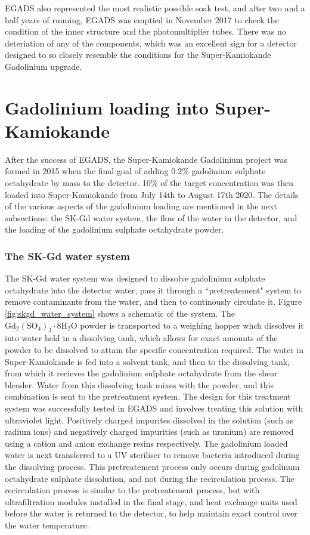 EGADS also represented the most realistic possible soak test, and after two and a half years of running, EGADS was emptied in November 2017 to check the condition of the inner structure and the photomultiplier tubes. There was no deteriation of any of the components, which was an excellent sign for a detector designed to so closely resemble the conditions for the Super-Kamiokande Gadolinium upgrade. 

\section{Gadolinium loading into Super-Kamiokande}

After the success of EGADS, the Super-Kamiokande Gadolinium project was formed in 2015 when the final goal of adding 0.2\% gadolinium sulphate octahydrate by mass to the detector. 10\% of the target concentration was then loaded into Super-Kamiokande from July 14th to August 17th 2020. The details of the various aspects of the gadolinium loading are mentioned in the next subsections: the SK-Gd water system, the flow of the water in the detector, and the loading of the gadolinium sulphate octahydrate powder.

\subsubsection{The SK-Gd water system}

The SK-Gd water system was designed to dissolve gadolinium sulphate octahydrate into the detector water, pass it through a ``pretreatement" system to remove contaminants from the water, and then to continously circulate it. Figure \ref{fig:skgd_water_system} shows a schematic of the system. The $\mathrm{Gd}_{2}\left(\mathrm{SO}_{4}\right)_{3} \cdot 8 \mathrm{H}_{2} \mathrm{O}$ powder is transported to a weighing hopper whch dissolves it into water held in a dissolving tank, which allows for exact amounts of the powder to be dissolved to attain the specific concentration required. The water in Super-Kamiokande is fed into a solvent tank, and then to the dissolving tank, from which it recieves the gadolinium sulphate octahydrate from the shear blender. Water from this dissolving tank mixes with the powder, and this combination is sent to the pretreatment system. The design for this treatment system was successfully tested in EGADS and involves treating this solution with ultraviolet light. Positively charged impurites dissolved in the solution (such as radium ions) and negatively charged impurities (such as uranium) are removed using a cation and anion exchange resins respectively. The gadolinium loaded water is next transferred to a UV steriliser to remove bacteria introduced during the dissolving process. This pretreatement process only occurs during gadolinum octahydrate sulphate dissolution, and not during the recirculation process. The recirculation process is similar to the pretreatement process, but with ultrafiltration modules installed in the final stage, and heat exchange units used before the water is returned to the detector, to help maintain exact control over the water temperature.

